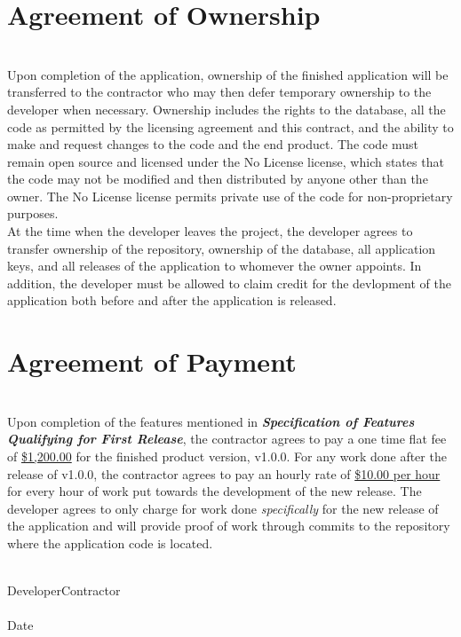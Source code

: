 \documentclass{article}
\begin{document}
\section{Agreement of Ownership}
\noindent\\
\indent Upon completion of the application, ownership of the finished application will be transferred to the contractor who may then defer temporary ownership to the developer when necessary.
Ownership includes the rights to the database, all the code as permitted by the licensing agreement and this contract, and the ability to make and request changes to the code and the end product.
The code must remain open source and licensed under the No License license, which states that the code may not be modified and then distributed by anyone other than the owner.
The No License license permits private use of the code for non-proprietary purposes.\\
\indent At the time when the developer leaves the project, the developer agrees to transfer ownership of the repository, ownership of the database, all application keys, and all releases of the application to whomever the owner appoints.
In addition, the developer must be allowed to claim credit for the devlopment of the application both before and after the application is released.
\vspace{1cm}
\section{Agreement of Payment}
\noindent\\
\indent Upon completion of the features mentioned in \textbf{\textit{Specification of Features Qualifying for First Release}}, the contractor agrees to pay a one time flat fee of \underline{\hspace{1em}\$1,200.00\hspace{1em}} for the finished product version, v1.0.0.
For any work done after the release of v1.0.0, the contractor agrees to pay an hourly rate of \underline{\hspace{1em}\$10.00 per hour\hspace{1em}} for every hour of work put towards the development of the new release.
The developer agrees to only charge for work done \textit{specifically} for the new release of the application and will provide proof of work through commits to the repository where the application code is located.

\vspace{4cm}
\underline{\hspace{15em}} \hspace{4em} \underline{\hspace{15em}}\\

\hspace{1em}Developer\hspace{15em}Contractor\\

\underline{\hspace{15em}}\\

\hspace{1em}Date
\end{document}
